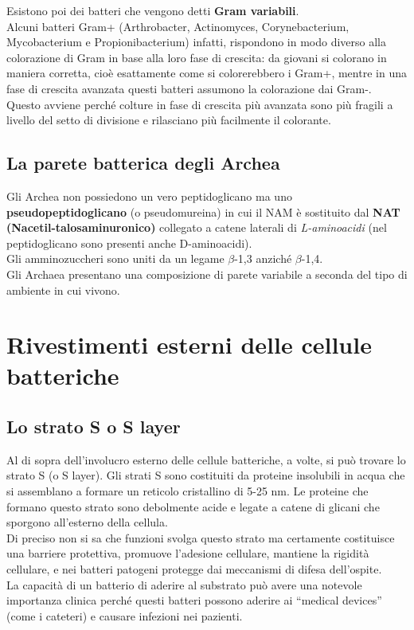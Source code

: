 \documentclass[11pt]{book}
\begin{document}
Esistono poi dei batteri che vengono detti \textbf{Gram variabili}.\\
Alcuni batteri Gram+ (Arthrobacter, Actinomyces, Corynebacterium, Mycobacterium e Propionibacterium) infatti, rispondono in modo diverso alla colorazione di Gram in base alla loro fase di crescita: da giovani si colorano in maniera corretta, cioè esattamente come si colorerebbero i Gram+, mentre in una fase di crescita avanzata questi batteri assumono la colorazione dai Gram-. Questo avviene perché colture in fase di crescita più avanzata sono più fragili a livello del setto di divisione e rilasciano più facilmente il colorante.


\subsection{La parete batterica degli Archea}
Gli Archea non possiedono un vero peptidoglicano ma uno \textbf{pseudopeptidoglicano} (o pseudomureina) in cui il NAM è sostituito dal \textbf{NAT (Nacetil-talosaminuronico)} collegato a catene laterali di \emph{L-aminoacidi} (nel peptidoglicano sono presenti anche D-aminoacidi).\\
Gli amminozuccheri sono uniti da un legame $\beta$-1,3 anziché $\beta$-1,4.\\
Gli Archaea presentano una composizione di parete variabile a seconda del tipo di ambiente in cui vivono.

\section{Rivestimenti esterni delle cellule batteriche}
\subsection{Lo strato S o S layer}

Al di sopra dell’involucro esterno delle cellule batteriche, a volte, si può trovare lo strato S (o S layer).
Gli strati S sono costituiti da proteine insolubili in acqua che si assemblano a formare un reticolo cristallino di 5-25 nm. Le proteine che formano questo strato sono debolmente acide e legate a catene di glicani che sporgono all’esterno della cellula.\\
Di preciso non si sa che funzioni svolga questo strato ma certamente costituisce una barriere protettiva, promuove l’adesione cellulare, mantiene la rigidità cellulare, e nei batteri patogeni protegge dai meccanismi di difesa dell’ospite.\\
La capacità di un batterio di aderire al substrato può avere una notevole importanza clinica perché questi batteri possono aderire ai “medical devices” (come i cateteri) e causare infezioni nei pazienti.
\end{document}
